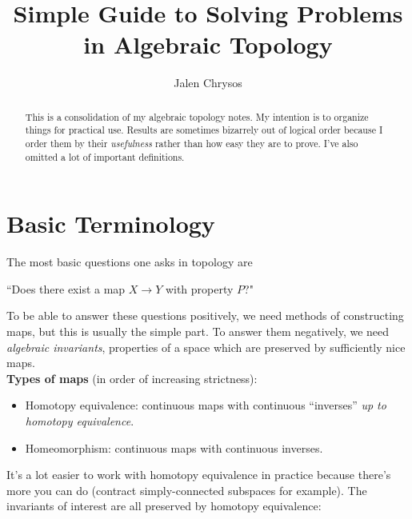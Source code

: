 \documentclass{amsart}
\title{Simple Guide to Solving Problems in Algebraic Topology}
\author{Jalen Chrysos}
\begin{document}
	\begin{abstract}This is a consolidation of my algebraic topology notes. My intention is to organize things for practical use. Results are sometimes bizarrely out of logical order because I order them by their \textit{usefulness} rather than how easy they are to prove. I've also omitted a lot of important definitions.
	\end{abstract}
	\maketitle
	
	\tableofcontents
	
	\newpage
	
	\section{Basic Terminology} 
	The most basic questions one asks in topology are 
	\begin{center}
		``Does there exist a map $X\to Y$ with property $P$?"
	\end{center} 
	To be able to answer these questions positively, we need methods of constructing maps, but this is usually the simple part. To answer them negatively, we need \textit{algebraic invariants}, properties of a space which are preserved by sufficiently nice maps.\\
	
	\textbf{Types of maps} (in order of increasing strictness):
	\begin{itemize}
		\item Homotopy equivalence: continuous maps with continuous ``inverses'' \textit{up to homotopy equivalence}.
		\item Homeomorphism: continuous maps with continuous inverses.
	\end{itemize}
	
	It's a lot easier to work with homotopy equivalence in practice because there's more you can do (contract simply-connected subspaces for example). The invariants of interest are all preserved by homotopy equivalence:\\
	
\end{document}
